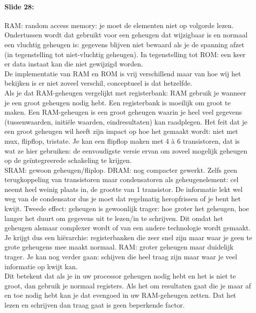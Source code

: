 \documentclass[10pt,a4paper]{book}
\begin{document}
\paragraph{Slide 28:} RAM: random access memory: je moet de elementen niet op volgorde lezen. Ondertussen wordt dat gebruikt voor een geheugen dat wijzigbaar is en normaal een vluchtig geheugen is: gegevens blijven niet bewaard als je de spanning afzet (in tegenstelling tot niet-vluchtig geheugen). In tegenstelling tot ROM: een keer er data instaat kan die niet gewijzigd worden.\\
De implementatie van RAM en ROM is vrij verschillend maar van hoe wij het bekijken is er niet zoveel verschil, conceptueel is dat hetzelfde.\\
Als je dat RAM-geheugen vergelijkt met registerbank: RAM gebruik je wanneer je een groot geheugen nodig hebt. Een registerbank is moeilijk om groot te maken. Een RAM-geheugen is een groot geheugen waarin je heel veel gegevens (tussenwaarden, initi\"ele waarden, eindresultaten) kan raadplegen. Het feit dat je een groot geheugen wil heeft zijn impact op hoe het gemaakt wordt: niet met mux, flipflop, tristate. Je kan een flipflop maken met 4 \`a 6 transistoren, dat is wat ze hier gebruiken: de eenvoudigste versie ervan om zoveel mogelijk geheugen op de ge\"integreerede schakeling te krijgen.\\
SRAM: gewoon geheugen/fliplop. DRAM: nog compacter gewerkt. Zelfs geen terugkoppeling van transistoren maar condensatoren als geheugenelement: cel neemt heel weinig plaats in, de grootte van 1 transistor. De informatie lekt wel weg van de condensator dus je moet dat regelmatig heropfrissen of je bent het kwijt. Tweede effect: geheugen is gewoonlijk trager: hoe groter het geheugen, hoe langer het duurt om gegevens uit te lezen/in te schrijven. Dit omdat het geheugen alsmaar complexer wordt of van een andere technologie wordt gemaakt.\\
Je krijgt dus een hi\"erarchie: registerbanken die zeer snel zijn maar waar je geen te grote geheugens mee maakt normaal. RAM: groter geheugen maar duidelijk trager. Je kan nog verder gaan: schijven die heel traag zijn maar waar je veel informatie op kwijt kan.\\
Dit betekent dat als je in uw processor geheugen nodig hebt en het is niet te groot, dan gebruik je normaal registers. Als het om resultaten gaat die je maar af en toe nodig hebt kan je dat evengoed in uw RAM-geheugen zetten. Dat het lezen en schrijven dan traag gaat is geen beperkende factor.\\
\end{document}
